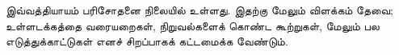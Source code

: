 \documentclass[../../../include/open-logic-chapter]{subfiles}
\begin{document}

\begin{editorial}
  இவ்வத்தியாயம் பரிசோதனை நிலையில் உள்ளது. இதற்கு மேலும் விளக்கம் தேவை;
  உள்ளடக்கத்தை வரையறைகள், நிறுவல்களைக் கொண்ட கூற்றுகள், மேலும் பல
  எடுத்துக்காட்டுகள் எனச் சிறப்பாகக் கட்டமைக்க வேண்டும்.
\end{editorial}


\OLEndChapterHook
\end{document}
